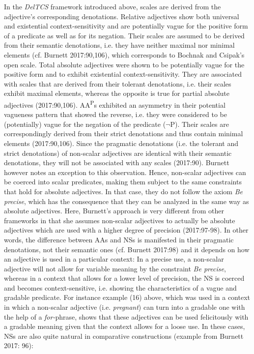 \documentclass[output=paper
,modfonts
,nonflat]{langsci/langscibook}
\begin{document}
In the \textit{DelTCS} framework introduced above, scales are derived from the adjective's corresponding denotations. Relative adjectives show both universal and existential context-sensitivity and are potentially vague for the positive form of a predicate as well as for its negation. Their scales are assumed to be derived from their semantic denotations, i.e. they have neither maximal nor minimal elements (cf. Burnett 2017:90,106), which corresponds to Bochnak and Csipak's open scale. Total absolute adjectives were shown to be potentially vague for the positive form and to exhibit existential context-sensitivity. They are associated with scales that are derived from their tolerant denotations, i.e. their scales exhibit maximal elements, whereas the opposite is true for partial absolute adjectives (2017:90,106). AA\textsuperscript{P}s exhibited an asymmetry in their potential vagueness pattern that showed the reverse, i.e. they were considered to be (potentially) vague for the negation of the predicate ($\neg$P). Their scales are correspondingly derived from their strict denotations and thus contain minimal elements (2017:90,106). Since the pragmatic denotations (i.e. the tolerant and strict denotations) of non-scalar adjectives are identical with their semantic denotations, they will not be associated with any scales (2017:90). Burnett however notes an exception to this observation. Hence, non-scalar adjectives can be coerced into scalar predicates, making them subject to the same constraints that hold for absolute adjectives. In that case, they do not follow the axiom \textit{Be precise}, which has the consequence that they can be analyzed in the same way as absolute adjectives. Here, Burnett's approach is very different from other frameworks in that she assumes non-scalar adjectives to actually be absolute adjectives which are used with a higher degree of precision (2017:97-98). In other words, the difference between AAs and NSs is manifested in their pragmatic denotations, not their semantic ones (cf. Burnett 2017:98) and it depends on how an adjective is used in a particular context: In a precise use, a non-scalar adjective will not allow for variable meaning by the constraint \textit{Be precise}, whereas in a context that allows for a lower level of precision, the NS is coerced and becomes context-sensitive, i.e. showing the characteristics of a vague and gradable predicate. For instance example (16) above, which was used in a context in which a non-scalar adjective (i.e. \textit{pregnant}) can turn into a gradable one with the help of a \textit{for-}phrase, shows that these adjectives can be used felicitously with a gradable meaning given that the context allows for a loose use. In these cases, NSs are also quite natural in comparative constructions (example from Burnett 2017: 96):
\end{document}

